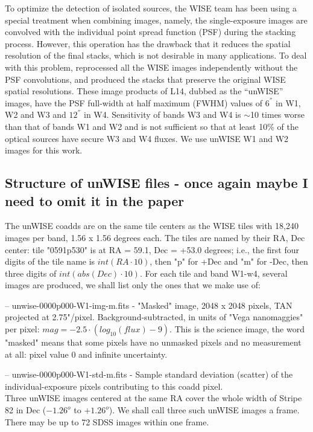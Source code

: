 \documentclass[apj,iop]{emulateapj}
\begin{document}
To optimize the detection of isolated sources, the WISE team has been using a special treatment when combining images, namely, the single-exposure images are convolved with the individual point spread function (PSF) during the stacking process. However, this operation has the drawback that it reduces the spatial resolution of the final stacks, which is not desirable in many applications. To deal with this problem, \citet[][hereafter L14]{Lang2014e} reprocessed all the WISE images independently without the PSF convolutions, and produced the stacks that preserve the original WISE spatial resolutions. These image products of L14,  dubbed as the ``unWISE'' images, have the PSF full-width at half maximum (FWHM) values of $6^{''}$ in W1, W2 and W3 and $12^{''}$ in W4. Sensitivity of bands W3 and W4 is $\sim$10 times worse than that of bands W1 and W2 and is not sufficient so that at least 10$\%$ of the optical sources have secure W3 and W4 fluxes. We use  unWISE W1 and W2 images for this work.

\subsection{Structure of unWISE files - once again maybe I need to omit it in the paper}

The unWISE coadds are on the same tile centers as the WISE tiles with 18,240 images per band, 1.56 x 1.56 degrees each. The tiles are named by their RA, Dec center: tile "0591p530" is at RA = 59.1, Dec = +53.0 degrees; i.e., the first four digits of the tile name is $int(RA \cdot 10)$, then "p" for +Dec and "m" for -Dec, then three digits of $int(abs(Dec)\cdot 10)$. For each tile and band W1-w4, several images are produced, we shall list only the ones that we make use of:

-- unwise-0000p000-W1-img-m.fits - "Masked" image, 2048 x 2048 pixels, TAN projected at 2.75"/pixel. Background-subtracted, in units of "Vega nanomaggies" per pixel: $mag = -2.5 \cdot (log_{10}(flux) - 9)$. This is the science image, the word "masked" means that some pixels have no unmasked pixels and no measurement at all: pixel value 0 and infinite uncertainty.

-- unwise-0000p000-W1-std-m.fits - Sample standard deviation (scatter) of the individual-exposure pixels  contributing to this coadd pixel.\\

Three unWISE images centered at the same RA cover the whole width of Stripe 82 in Dec ($-1.26^o$ to $+1.26^o$). We shall call three such unWISE images a frame. There may be up to 72 SDSS images within one frame.
\end{document}
